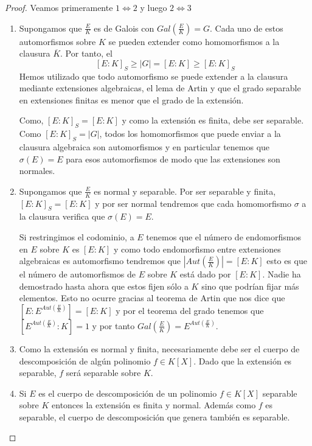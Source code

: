 \begin{proof}
Veamos primeramente $1 \iff 2$ y luego $2 \iff 3$

\begin{enumerate}
\item Supongamos que $\frac{E}{K}$ es de Galois con $Gal(\frac{E}{K}) = G$. Cada uno de estos automorfismos sobre $K$ se pueden extender como homomorfismos a la clausura $\overline{K}$. Por tanto, el $$[E:K]_S \ge |G| = [E:K] \ge [E:K]_S$$ Hemos utilizado que todo automorfismo se puede extender a la clausura mediante extensiones algebraicas, el lema de Artin y que el grado separable en extensiones finitas es menor que el grado de la extensión. 

Como, $[E:K]_S = [E:K]$ y como la extensión es finita, debe ser separable. Como $[E:K]_S = |G|$, todos los homomorfismos que puede enviar a la clausura algebraica son automorfismos y en particular tenemos que $\sigma(E) = E$ para esos automorfismos de modo que las extensiones son normales. 

\item Supongamos que $\frac{E}{K}$ es normal y separable. Por ser separable y finita, $[E:K]_S = [E:K]$ y por ser normal tendremos que cada homomorfismo $\sigma$ a la clausura verifica que $\sigma(E) = E$. 

Si restringimos el codominio, a $E$ tenemos que el número de endomorfismos en $E$ sobre $K$ es $[E:K]$ y como todo endomorfismo entre extensiones algebraicas es automorfismo tendremos que $|Aut(\frac{E}{K})| = [E:K]$ esto es que el número de automorfismos de $E$ sobre $K$ está dado por $[E:K]$. Nadie ha demostrado hasta ahora que estos fijen sólo a $K$ sino que podrían fijar más elementos. Esto no ocurre gracias al teorema de Artin que nos dice que $[E:E^{Aut(\frac{E}{K})}] = [E:K]$ y por el teorema del grado tenemos que $[E^{Aut(\frac{E}{K})}:K] = 1$ y por tanto $Gal(\frac{E}{K}) = E^{Aut(\frac{E}{K})}$.

\item Como la extensión es normal y finita, necesariamente debe ser el cuerpo de descomposición de algún polinomio $f \in K[X]$. Dado que la extensión es separable, $f$ será separable sobre $K$. 

\item Si $E$ es el cuerpo de descomposición de un polinomio $f \in K[X]$ separable sobre $K$ entonces la extensión es finita y normal. Además como $f$ es separable, el cuerpo de descomposición que genera también es separable. 
\end{enumerate}
\end{proof}

